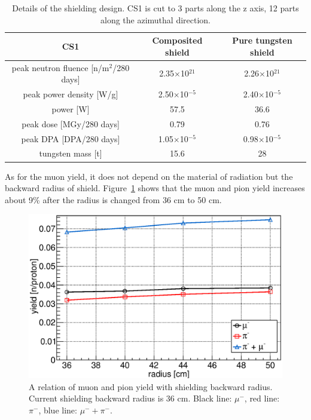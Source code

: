 \begin{table}[H]
 \centering
 \begin{tabular}{ccc} \hline \hline
  CS1 & Composited shield & Pure tungsten shield \\ \hline
  peak neutron fluence [n/m$^2$/280 days] & 2.35$\times$10$^{21}$ & 2.26$\times$10$^{21}$ \\
  peak power density [W/g] & 2.50$\times$10$^{-5}$ & 2.40$\times$10$^{-5}$ \\
  power [W] & 57.5 & 36.6 \\
  peak dose [MGy/280 days] & 0.79 & 0.76 \\
  peak DPA [DPA/280 days] & 1.05$\times$10$^{-5}$ & 0.98$\times$10$^{-5}$ \\
  tungsten mass [t] & 15.6 & 28 \\ \hline \hline
 \end{tabular}
 \caption{Details of the shielding design. CS1 is cut to 3 parts along the z axis, 12 parts along the azimuthal direction.}
 \label{hrsdet}
\end{table}

As for the muon yield, it does not depend on the material of radiation but the backward radius of shield.
Figure~\ref{radius} shows that the muon and pion yield increases about 9\% after the radius is changed from 36 cm to 50 cm.
\begin{figure}[H]
 \centering
 \includegraphics[scale=0.43]{chapter3/fig/muon}
 \caption{A relation of muon and pion yield with shielding backward radius. Current shielding backward radius is 36 cm. Black line: $\mu^-$, red line: $\pi^-$, blue line: $\mu^- + \pi^-$.}
 \label{radius}
\end{figure}

